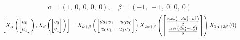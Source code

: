 \documentclass[11pt]{article}
\theoremstyle{definition}
\begin{document}
\[
\alpha = \left( 1, \  0, \  0, \  0, \  0\right), \quad \beta = \left( -1, \  -1, \  0, \  0, \  0\right)
\]
\[
\scaletoalign{\textwidth}{\left[ X_{\alpha}\left(\left[\begin{matrix}u_{0}\\u_{1}\end{matrix}\right]\right), X_{\beta}\left(\left[\begin{matrix}v_{0}\\v_{1}\end{matrix}\right]\right) \right] = X_{\alpha + \beta}\left(\left[\begin{matrix}d u_{1} v_{1} - u_{0} v_{0}\\u_{0} v_{1} - u_{1} v_{0}\end{matrix}\right]\right) X_{2\alpha + \beta}\left(\left[\begin{matrix}\frac{c_{0} v_{0} \left(- d u_{1}^{2} + u_{0}^{2}\right)}{2}\\\frac{c_{0} v_{1} \left(d u_{1}^{2} - u_{0}^{2}\right)}{2}\end{matrix}\right]\right) X_{2\alpha + 2\beta}\left(0\right)}
\]
\end{document}
